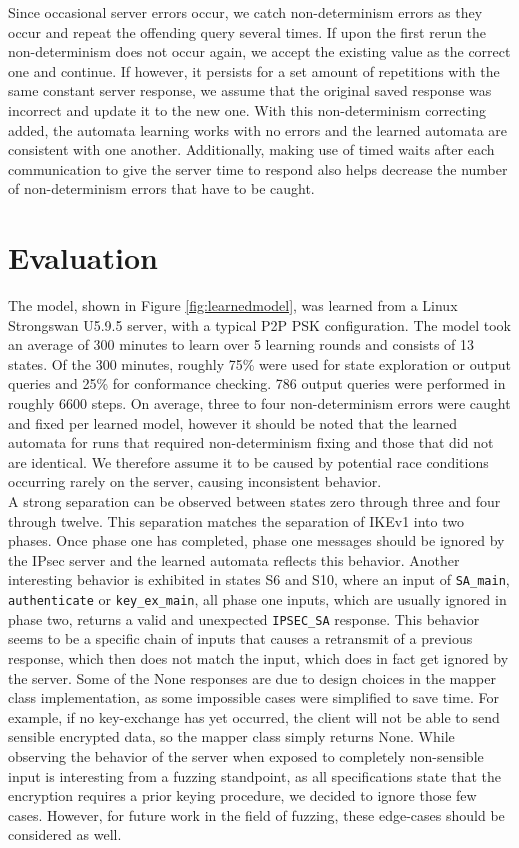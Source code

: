 \documentclass[runningheads]{llncs}
\begin{document}
Since occasional server errors occur, we catch non-determinism errors as they occur and repeat the offending query several times. If upon the first rerun the non-determinism does not occur again, we accept the existing value as the correct one and continue. If however, it persists for a set amount of repetitions with the same constant server response, we assume that the original saved response was incorrect and update it to the new one. With this non-determinism correcting added, the automata learning works with no errors and the learned automata are consistent with one another. Additionally, making use of timed waits after each communication to give the server time to respond also helps decrease the number of non-determinism errors that have to be caught.

\section{Evaluation} \label{chap:5} %
The model, shown in Figure \ref{fig:learnedmodel}, was learned from a Linux Strongswan U5.9.5 server, with a typical P2P PSK configuration. The model took an average of 300 minutes to learn over 5 learning rounds and consists of 13 states. Of the 300 minutes, roughly 75\% were used for state exploration or output queries and 25\% for conformance checking. 786 output queries were performed in roughly 6600 steps. On average, three to four non-determinism errors were caught and fixed per learned model, however it should be noted that the learned automata for runs that required non-determinism fixing and those that did not are identical. We therefore assume it to be caused by potential race conditions occurring rarely on the server, causing inconsistent behavior. \\


A strong separation can be observed between states zero through three and four through twelve. This separation matches the separation of IKEv1 into two phases. Once phase one has completed, phase one messages should be ignored by the IPsec server and the learned automata reflects this behavior. Another interesting behavior is exhibited in states S6 and S10, where an input of \texttt{SA\_main}, \texttt{authenticate} or \texttt{key\_ex\_main}, all phase one inputs, which are usually ignored in phase two, returns a valid and unexpected \texttt{IPSEC\_SA} response. This behavior seems to be a specific chain of inputs that causes a retransmit of a previous response, which then does not match the input, which does in fact get ignored by the server. Some of the None responses are due to design choices in the mapper class implementation, as some impossible cases were simplified to save time. For example, if no key-exchange has yet occurred, the client will not be able to send sensible encrypted data, so the mapper class simply returns None. While observing the behavior of the server when exposed to completely non-sensible input is interesting from a fuzzing standpoint, as all specifications state that the encryption requires a prior keying procedure, we decided to ignore those few cases. However, for future work in the field of fuzzing, these edge-cases should be considered as well.\\
\end{document}
